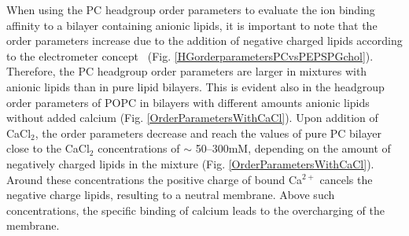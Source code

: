 \documentclass[journal=jpcbfk,manuscript=article]{achemso}
\begin{document}
When using the PC headgroup order parameters to evaluate the ion binding affinity to a bilayer containing anionic lipids,
it is important to note that the order parameters
increase due to the addition of negative charged lipids according to the electrometer
concept~\cite{seelig87, scherer87} (Fig. \ref{HGorderparametersPCvsPEPSPGchol}).
Therefore, the PC headgroup order parameters are larger in mixtures with anionic lipids
than in pure lipid bilayers. This is evident also in the headgroup order parameters
of POPC in bilayers with different amounts anionic lipids without added calcium (Fig. \ref{OrderParametersWithCaCl}).
Upon addition of CaCl$_2$, the order parameters decrease and reach the values of pure PC bilayer close 
to the CaCl$_2$ concentrations of $\sim$ 50--300mM, depending on the amount of negatively charged
lipids in the mixture (Fig. \ref{OrderParametersWithCaCl}).
Around these concentrations the positive charge of bound Ca$^{2+}$ cancels
the negative charge lipids, resulting to a neutral membrane. 
Above such concentrations, the specific binding of calcium leads to
the overcharging of the membrane.
\end{document}
